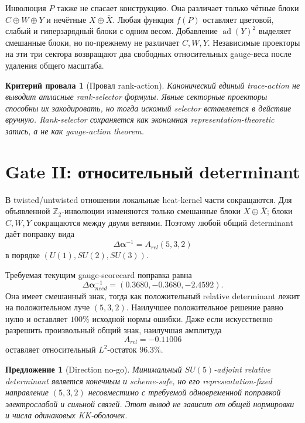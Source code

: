 \documentclass[12pt,a4paper]{article}
\newtheorem{proposition}{Предложение}
\newtheorem{nogocriterion}{Критерий провала}
\begin{document}
Инволюция $P$ также не спасает конструкцию. Она различает только чётные блоки
$C\oplus W\oplus Y$ и нечётные $X\oplus\overline X$. Любая функция $f(P)$
оставляет цветовой, слабый и гиперзарядный блоки с одним весом. Добавление
$\operatorname{ad}(Y)^2$ выделяет смешанные блоки, но по-прежнему не различает
$C,W,Y$. Независимые проекторы на эти три сектора возвращают два свободных
относительных gauge-веса после удаления общего масштаба.

\begin{nogocriterion}[Провал rank-action]
Канонический единый trace-action не выводит атласные rank-selector формулы.
Явные секторные проекторы способны их закодировать, но тогда искомый selector
вставляется в действие вручную. Rank-selector сохраняется как экономная
representation-theoretic запись, а не как gauge-action theorem.
\end{nogocriterion}

\section{Gate II: относительный determinant}

В twisted/untwisted отношении локальные heat-kernel части сокращаются. Для
объявленной $\mathbb Z_2$-инволюции изменяются только смешанные блоки
$X\oplus\overline X$; блоки $C,W,Y$ сокращаются между двумя ветвями. Поэтому
любой общий determinant даёт поправку вида
\begin{equation}
 \Delta\boldsymbol{\alpha}^{-1}
 =A_{rel}(5,3,2)
\end{equation}
в порядке $(U(1),SU(2),SU(3))$.

Требуемая текущим gauge-scorecard поправка равна
\begin{equation}
 \Delta\boldsymbol{\alpha}^{-1}_{need}
 =(0.3680,-0.3680,-2.4592).
\end{equation}
Она имеет смешанный знак, тогда как положительный relative determinant лежит
на положительном луче $(5,3,2)$. Наилучшее положительное решение равно нулю и
оставляет $100\%$ исходной нормы ошибки. Даже если искусственно разрешить
произвольный общий знак, наилучшая амплитуда
\begin{equation}
 A_{rel}=-0.11006
\end{equation}
оставляет относительный $L^2$-остаток $96.3\%$.

\begin{proposition}[Direction no-go]
Минимальный $SU(5)$-adjoint relative determinant является конечным и
scheme-safe, но его representation-fixed направление $(5,3,2)$ несовместимо
с требуемой одновременной поправкой электрослабой и сильной связей. Этот вывод
не зависит от общей нормировки и числа одинаковых KK-оболочек.
\end{proposition}
\end{document}

